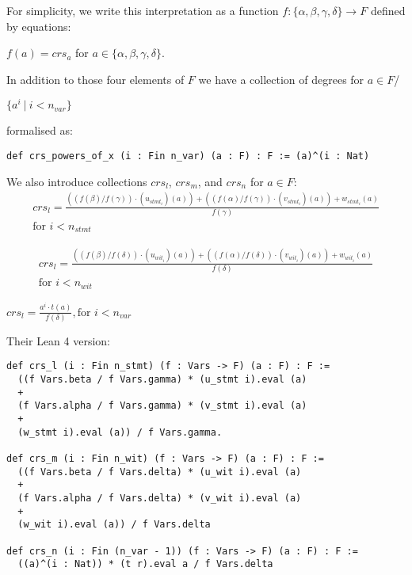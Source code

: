 \documentclass{article}
\theoremstyle{definition}
\theoremstyle{remark}
\begin{document}
For simplicity, we write this interpretation as a function $f :  \{ \alpha,\beta,\gamma, \delta \} \to F$ defined by equations:
\begin{center}
$f(a) = crs_{a}$ for $a \in \{ \alpha,\beta,\gamma, \delta \}$.
\end{center}

In addition to those four elements of $F$ we have a collection of degrees for $a \in F$/
\begin{center}
$\{ a^i \: | \: i < n_{var} \}$
\end{center}
formalised as:
\begin{lstlisting}
def crs_powers_of_x (i : Fin n_var) (a : F) : F := (a)^(i : Nat)
\end{lstlisting}

We also introduce collections $crs_l$, $crs_m$, and $crs_n$ for $a \in F$:
\begin{multline}
crs_l = \frac{((f(\beta) / f(\gamma)) \cdot (u_{{stmt}_i})(a)) + ((f(\alpha) / f(\gamma)) \cdot (v_{{stmt}_i})(a)) + w_{{stmt}_i}(a)}{f(\gamma)} \\ \text{for $i < n_{stmt}$}
\end{multline}

\begin{multline}
crs_l = \frac{((f(\beta) / f(\delta)) \cdot (u_{{wit}_i})(a)) + ((f(\alpha) / f(\delta)) \cdot (v_{{wit}_i})(a)) + w_{{wit}_i}(a)}{f(\delta)} \\ \text{for $i < n_{wit}$}
\end{multline}

\begin{center}
$crs_l = \frac{a^i \cdot t(a)}{f(\delta)}, \text{for $i < n_{var}$}$
\end{center}

Their Lean 4 version:

\begin{lstlisting}
def crs_l (i : Fin n_stmt) (f : Vars -> F) (a : F) : F :=
  ((f Vars.beta / f Vars.gamma) * (u_stmt i).eval (a)
  +
  (f Vars.alpha / f Vars.gamma) * (v_stmt i).eval (a)
  +
  (w_stmt i).eval (a)) / f Vars.gamma.

def crs_m (i : Fin n_wit) (f : Vars -> F) (a : F) : F :=
  ((f Vars.beta / f Vars.delta) * (u_wit i).eval (a)
  +
  (f Vars.alpha / f Vars.delta) * (v_wit i).eval (a)
  +
  (w_wit i).eval (a)) / f Vars.delta

def crs_n (i : Fin (n_var - 1)) (f : Vars -> F) (a : F) : F :=
  ((a)^(i : Nat)) * (t r).eval a / f Vars.delta
\end{lstlisting}
\end{document}
